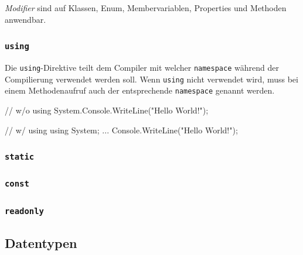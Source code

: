 \documentclass[
  9pt,
  a4paperpaper,
  DIV=11]{scrartcl}
\newenvironment{Shaded}{}{}
\newcommand{\CommentTok}[1]{\textcolor[rgb]{0.42,0.45,0.49}{#1}}
\newcommand{\FunctionTok}[1]{\textcolor[rgb]{0.44,0.26,0.76}{#1}}
\newcommand{\KeywordTok}[1]{\textcolor[rgb]{0.84,0.23,0.29}{#1}}
\newcommand{\NormalTok}[1]{\textcolor[rgb]{0.14,0.16,0.18}{#1}}
\newcommand{\OperatorTok}[1]{\textcolor[rgb]{0.14,0.16,0.18}{#1}}
\newcommand{\StringTok}[1]{\textcolor[rgb]{0.01,0.18,0.38}{#1}}
\numberwithin{equation}{section}
\begin{document}
\begin{multicols}{2}
\emph{Modifier} sind auf Klassen, Enum, Membervariablen, Properties und
Methoden anwendbar.

\hypertarget{using}{%
\subsubsection{\texorpdfstring{\texttt{using}}{using}}\label{using}}

Die \texttt{using}-Direktive teilt dem Compiler mit welcher
\texttt{namespace} während der Compilierung verwendet werden soll. Wenn
\texttt{using} nicht verwendet wird, muss bei einem Methodenaufruf auch
der entsprechende \texttt{namespace} genannt werden.

\begin{Shaded}
\begin{Highlighting}[]
\CommentTok{// w/o \textasciigrave{}using\textasciigrave{}}
\NormalTok{System}\OperatorTok{.}\FunctionTok{Console}\OperatorTok{.}\FunctionTok{WriteLine}\OperatorTok{(}\StringTok{"Hello World!"}\OperatorTok{);}

\CommentTok{// w/ \textasciigrave{}using\textasciigrave{}}
\KeywordTok{using}\NormalTok{ System}\OperatorTok{;}
\OperatorTok{...}
\NormalTok{Console}\OperatorTok{.}\FunctionTok{WriteLine}\OperatorTok{(}\StringTok{"Hello World!"}\OperatorTok{);}
\end{Highlighting}
\end{Shaded}

\hypertarget{static}{%
\subsubsection{\texorpdfstring{\texttt{static}}{static}}\label{static}}

\hypertarget{const}{%
\subsubsection{\texorpdfstring{\texttt{const}}{const}}\label{const}}

\hypertarget{readonly}{%
\subsubsection{\texorpdfstring{\texttt{readonly}}{readonly}}\label{readonly}}

\hypertarget{datentypen}{%
\subsection{Datentypen}\label{datentypen}}


\end{multicols}
\end{document}
